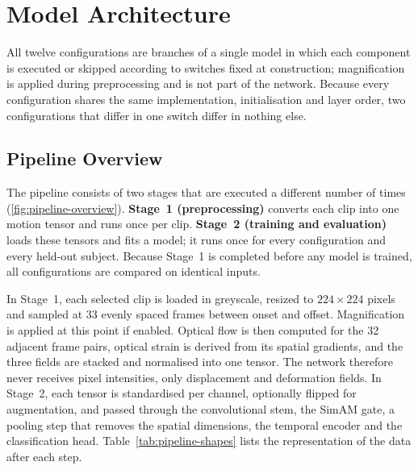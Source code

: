 \section{Model Architecture}
\label{sec:architecture}

All twelve configurations are branches of a single model in which each component is executed or skipped according to switches fixed at construction; magnification is applied during preprocessing and is not part of the network. Because every configuration shares the same implementation, initialisation and layer order, two configurations that differ in one switch differ in nothing else.

\subsection{Pipeline Overview}
\label{sec:pipeline-overview}
\label{sec:pipeline-in-words}
\label{sec:pipeline-shapes-discussion}

The pipeline consists of two stages that are executed a different number of times (\autoref{fig:pipeline-overview}). \textbf{Stage~1 (preprocessing)} converts each clip into one motion tensor and runs once per clip. \textbf{Stage~2 (training and evaluation)} loads these tensors and fits a model; it runs once for every configuration and every held-out subject. Because Stage~1 is completed before any model is trained, all configurations are compared on identical inputs.

In Stage~1, each selected clip is loaded in greyscale, resized to $224\times224$ pixels and sampled at 33 evenly spaced frames between onset and offset. Magnification is applied at this point if enabled. Optical flow is then computed for the 32 adjacent frame pairs, optical strain is derived from its spatial gradients, and the three fields are stacked and normalised into one tensor. The network therefore never receives pixel intensities, only displacement and deformation fields. In Stage~2, each tensor is standardised per channel, optionally flipped for augmentation, and passed through the convolutional stem, the SimAM gate, a pooling step that removes the spatial dimensions, the temporal encoder and the classification head. Table~\ref{tab:pipeline-shapes} lists the representation of the data after each step.

